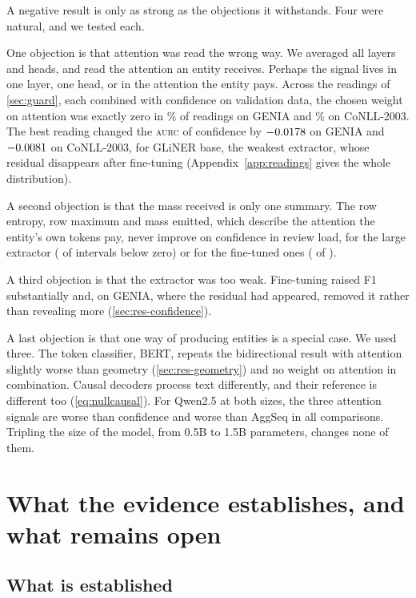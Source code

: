 \documentclass[11pt,a4paper]{article}
\newcommand{\gliner}{GLiNER}
\newcommand{\aurc}{\textsc{aurc}}
\begin{document}
A negative result is only as strong as the objections it withstands. Four were natural, and we tested each.

One objection is that attention was read the wrong way. We averaged all layers and heads, and read the attention an entity
receives. Perhaps the signal lives in one layer, one head, or in the attention the entity pays. Across the \periReadings{}
readings of \cref{sec:guard}, each combined with confidence on validation data, the chosen weight on attention was exactly
zero in \periGeniaZeroWeight\% of readings on GENIA and \periConllZeroWeight\% on CoNLL-2003. The best reading changed the \aurc{} of confidence by
$-0.0178$ on GENIA and $-0.0081$ on CoNLL-2003, for \gliner{} base, the weakest extractor, whose residual
disappears after fine-tuning (Appendix~\ref{app:readings} gives the whole distribution).


A second objection is that the mass received is only one summary. The row entropy, row maximum and mass emitted, which
describe the attention the entity's own tokens pay, never improve on confidence in review load, for the large extractor
(\famLargeAttFav{} of \famLargeAttN{} intervals below zero) or for the fine-tuned ones (\famTunedAttFav{} of
\famTunedAttN).

A third objection is that the extractor was too weak. Fine-tuning raised F1 substantially and, on GENIA, where the residual
had appeared, removed it rather than revealing more (\cref{sec:res-confidence}).

A last objection is that one way of producing entities is a special case. We used three. The token classifier, BERT, repeats
the bidirectional result with attention slightly worse than geometry (\cref{sec:res-geometry}) and no weight on attention in
combination. Causal decoders process text differently, and their reference is different too (\cref{eq:nullcausal}). For
Qwen2.5 at both sizes, the three attention signals are worse than confidence and worse than AggSeq in all
\decAttPooledN{} comparisons. Tripling the size of the model, from 0.5B to 1.5B parameters, changes none of them.

\section{What the evidence establishes, and what remains open}
\label{sec:discussion}

\subsection{What is established}
\end{document}
